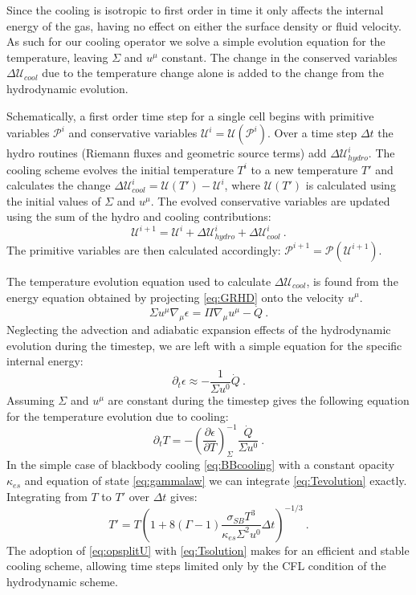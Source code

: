 \documentclass{emulateapj}
\newcommand{\Gam}{\Gamma}
\newcommand{\De}{\Delta}
\newcommand{\eps}{\epsilon}
\newcommand{\sig}{\sigma}
\newcommand{\Sig}{\Sigma}
\newcommand{\ka}{\kappa}
\newcommand{\pd}{\partial}
\begin{document}
Since the cooling is isotropic to first order in time it only affects the internal energy of the gas, having no effect on either the surface density or fluid velocity.  As such for our cooling operator we solve a simple evolution equation for the temperature, leaving $\Sig$ and $u^\mu$ constant.  The change in the conserved variables $\De \mathcal{U}_{cool}$ due to the temperature change alone is added to the change from the hydrodynamic evolution.

Schematically, a first order time step for a single cell begins with primitive variables $\mathcal{P}^i$ and conservative variables $\mathcal{U}^i = \mathcal{U}(\mathcal{P}^i)$.  Over a time step $\De t$ the hydro routines (Riemann fluxes and geometric source terms) add $\De \mathcal{U}^i_{hydro}$.  The cooling scheme evolves the initial temperature $T^i$ to a new temperature $T'$ and calculates the change $\De \mathcal{U}^i_{cool} = \mathcal{U}(T') - \mathcal{U}^i$, where $\mathcal{U}(T')$ is calculated using the initial values of $\Sig$ and $u^\mu$.  The evolved conservative variables are updated using the sum of the hydro and cooling contributions: 
\begin{equation}
	\mathcal{U}^{i+1} = \mathcal{U}^i + \De \mathcal{U}^i_{hydro} + \De \mathcal{U}^i_{cool} \ . \label{eq:opsplitU}
\end{equation}
The primitive variables are then calculated accordingly: $\mathcal{P}^{i+1} = \mathcal{P}(\mathcal{U}^{i+1})$.

The temperature evolution equation used to calculate $\De \mathcal{U}_{cool}$, is found from the energy equation obtained by projecting \eqref{eq:GRHD} onto the velocity $u^\mu$.
\begin{equation}
	\Sig u^\mu \nabla_\mu \eps = \Pi \nabla_\mu u^\mu - \dot{Q} \ .
\end{equation}
Neglecting the advection and adiabatic expansion effects of the hydrodynamic evolution during the timestep, we are left with a simple equation for the specific internal energy:
\begin{equation}
	\pd_t \eps \approx - \frac{1}{\Sig u^0} \dot{Q} \ .
\end{equation}
Assuming $\Sig$ and $u^\mu$ are constant during the timestep gives the following equation for the temperature evolution due to cooling:
\begin{equation}
	\pd_t T = - \left(\frac{\pd \eps}{\pd T}\right)_{\Sig}^{-1} \frac{\dot{Q}}{\Sig u^0} \ . \label{eq:Tevolution}
\end{equation}
In the simple case of blackbody cooling \eqref{eq:BBcooling} with a constant opacity $\ka_{es}$ and equation of state \eqref{eq:gammalaw} we can integrate \eqref{eq:Tevolution} exactly.  Integrating from $T$ to $T'$ over $\De t$ gives:
\begin{equation}
	T' = T \left( 1 + 8 (\Gam-1) \frac{\sig_{SB} T^3}{\ka_{es}\Sig^2 u^0} \De t \right)^{-1/3} \ . \label{eq:Tsolution}
\end{equation}
The adoption of \eqref{eq:opsplitU} with \eqref{eq:Tsolution} makes for an efficient and stable cooling scheme, allowing time steps limited only by the CFL condition of the hydrodynamic scheme.
\end{document}
